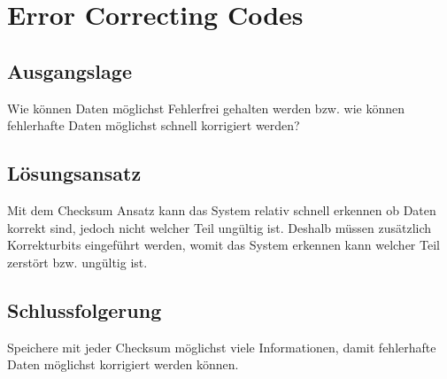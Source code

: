 \section{Error Correcting Codes}

\subsection{Ausgangslage}

Wie können Daten möglichst Fehlerfrei gehalten werden bzw. wie können fehlerhafte Daten möglichst schnell korrigiert werden?

\subsection{Lösungsansatz}

Mit dem Checksum Ansatz kann das System relativ schnell erkennen ob Daten korrekt sind, jedoch nicht welcher Teil ungültig ist. Deshalb müssen zusätzlich Korrekturbits eingeführt werden, womit das System erkennen kann welcher Teil zerstört bzw. ungültig ist.

\subsection{Schlussfolgerung}

Speichere mit jeder Checksum möglichst viele Informationen, damit fehlerhafte Daten möglichst korrigiert werden können.

